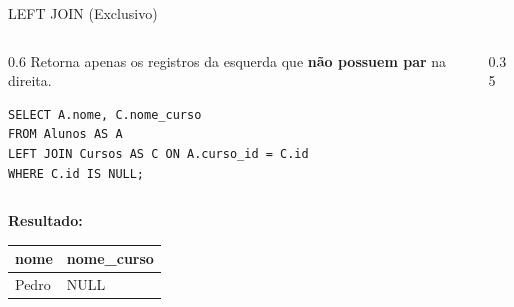 \documentclass[10pt]{beamer}
\begin{document}
\begin{frame}[fragile]{LEFT JOIN (Exclusivo)}
    \begin{columns}
        \begin{column}{0.6\textwidth}
            Retorna apenas os registros da esquerda que \textbf{não possuem par} na direita.
            \begin{lstlisting}
SELECT A.nome, C.nome_curso
FROM Alunos AS A
LEFT JOIN Cursos AS C ON A.curso_id = C.id
WHERE C.id IS NULL;
            \end{lstlisting}
        \end{column}
        \begin{column}{0.35\textwidth}
            \centering
        \end{column}
    \end{columns}
    \textbf{Resultado:}
    \small
    \begin{table}
        \begin{tabular}{ll}
        \toprule
        \textbf{nome} & \textbf{nome\_curso} \\ \midrule
        \alert{Pedro} & \alert{NULL} \\ \bottomrule
        \end{tabular}
    \end{table}
\end{frame}
\end{document}
